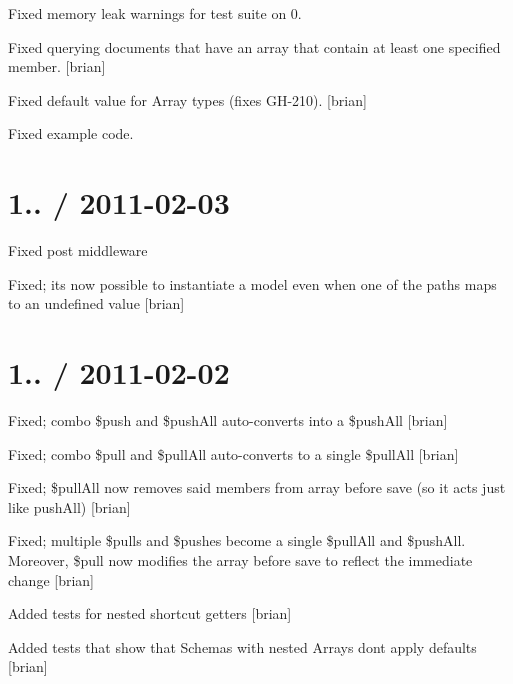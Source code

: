 \begin{DoxyItemize}
\item Fixed memory leak warnings for test suite on 0.
\item Fixed querying documents that have an array that contain at least one specified member. \mbox{[}brian\mbox{]}
\item Fixed default value for Array types (fixes G\+H-\/210). \mbox{[}brian\mbox{]}
\item Fixed example code.
\end{DoxyItemize}

\section*{1.. / 2011-\/02-\/03 }


\begin{DoxyItemize}
\item Fixed {\ttfamily post} middleware
\item Fixed; it\textquotesingle{}s now possible to instantiate a model even when one of the paths maps to an undefined value \mbox{[}brian\mbox{]}
\end{DoxyItemize}

\section*{1.. / 2011-\/02-\/02 }


\begin{DoxyItemize}
\item Fixed; combo \$push and \$push\+All auto-\/converts into a \$push\+All \mbox{[}brian\mbox{]}
\item Fixed; combo \$pull and \$pull\+All auto-\/converts to a single \$pull\+All \mbox{[}brian\mbox{]}
\item Fixed; \$pull\+All now removes said members from array before save (so it acts just like push\+All) \mbox{[}brian\mbox{]}
\item Fixed; multiple \$pulls and \$pushes become a single \$pull\+All and \$push\+All. Moreover, \$pull now modifies the array before save to reflect the immediate change \mbox{[}brian\mbox{]}
\item Added tests for nested shortcut getters \mbox{[}brian\mbox{]}
\item Added tests that show that Schemas with nested Arrays don\textquotesingle{}t apply defaults \mbox{[}brian\mbox{]}
\end{DoxyItemize}

